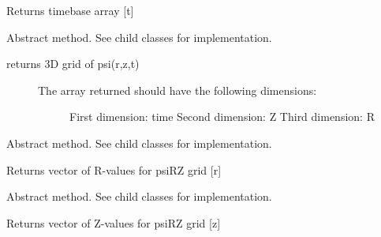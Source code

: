 \documentclass[letterpaper,10pt,english]{sphinxmanual}
\begin{document}
\begin{fulllineitems}
\begin{fulllineitems}
Returns timebase array {[}t{]}

\end{fulllineitems}


\begin{fulllineitems}
\label{\detokenize{eqtools:eqtools.core.Equilibrium.getFluxGrid}}
Abstract method.  See child classes for implementation.
\begin{description}
\item[{returns 3D grid of psi(r,z,t)}] \leavevmode\begin{description}
\item[{The array returned should have the following dimensions:}] \leavevmode
First dimension: time
Second dimension: Z
Third dimension: R

\end{description}

\end{description}

\end{fulllineitems}


\begin{fulllineitems}
\label{\detokenize{eqtools:eqtools.core.Equilibrium.getRGrid}}
Abstract method.  See child classes for implementation.

Returns vector of R-values for psiRZ grid {[}r{]}

\end{fulllineitems}


\begin{fulllineitems}
\label{\detokenize{eqtools:eqtools.core.Equilibrium.getZGrid}}
Abstract method.  See child classes for implementation.

Returns vector of Z-values for psiRZ grid {[}z{]}

\end{fulllineitems}


\end{fulllineitems}
\end{document}
